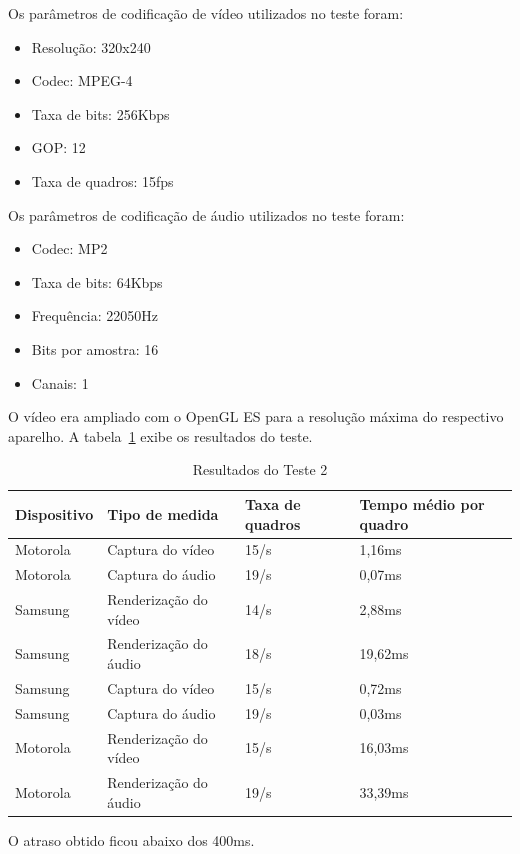 \documentclass{acm_proc_article-sp}
\begin{document}
Os parâmetros de codificação de vídeo utilizados no teste foram:
\begin{itemize}
 \item Resolução: 320x240
 \item Codec: MPEG-4
 \item Taxa de bits: 256Kbps
 \item GOP: 12
 \item Taxa de quadros: 15fps
\end{itemize}
Os parâmetros de codificação de áudio utilizados no teste foram:
\begin{itemize}
 \item Codec: MP2
 \item Taxa de bits: 64Kbps
 \item Frequência: 22050Hz
 \item Bits por amostra: 16
 \item Canais: 1
\end{itemize}
O vídeo era ampliado com o OpenGL ES para a resolução máxima do respectivo aparelho. A tabela~\ref{tabela_teste2} exibe os resultados do teste.
\begin{table}
\centering
\caption{Resultados do Teste 2}
\label{tabela_teste2}
\begin{tabular}{|p{1.5cm}|p{2.5cm}|p{1.2cm}|p{1.2cm}|} \hline
Dispositivo&Tipo de medida&Taxa de quadros&Tempo médio por quadro\\ \hline
Motorola&Captura do vídeo&15/s&1,16ms\\ \hline
Motorola&Captura do áudio&19/s&0,07ms\\ \hline
Samsung&Renderização do vídeo&14/s&2,88ms\\ \hline
Samsung&Renderização do áudio&18/s&19,62ms\\ \hline
Samsung&Captura do vídeo&15/s&0,72ms\\ \hline
Samsung&Captura do áudio&19/s&0,03ms\\ \hline
Motorola&Renderização do vídeo&15/s&16,03ms\\ \hline
Motorola&Renderização do áudio&19/s&33,39ms\\
\hline\end{tabular}
\end{table}
O atraso obtido ficou abaixo dos 400ms.
\end{document}
